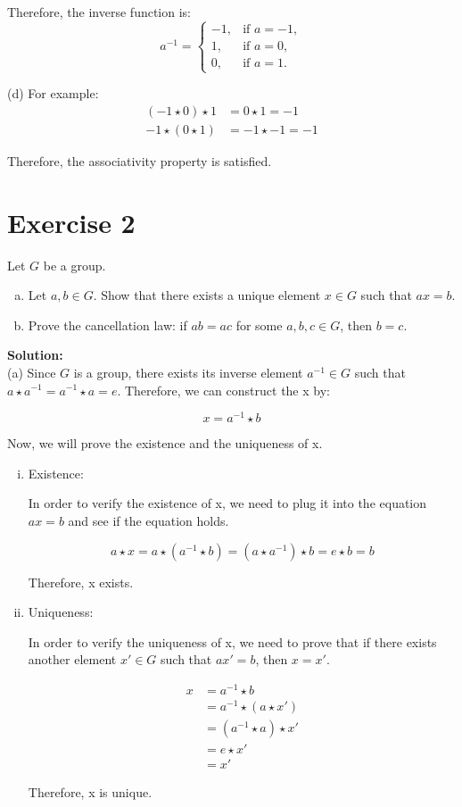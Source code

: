 \documentclass{article}
\begin{document}
Therefore, the inverse function is:
\[
a^{-1} = \begin{cases}
-1, & \text{if } a = -1, \\
1, & \text{if } a = 0, \\
0, & \text{if } a = 1.
\end{cases}
\]

(d) For example:
\begin{align*}
(-1 \star 0) \star 1 &= 0 \star 1 = -1 \\
-1 \star (0 \star 1) &= -1 \star -1 = -1
\end{align*}

Therefore, the associativity property is satisfied.

\newpage

\section*{Exercise 2}

Let $G$ be a group.
\begin{enumerate}[(a)]
\item Let $a,b \in G$. Show that there exists a unique element $x \in G$ such that $ax=b$.
\item Prove the cancellation law: if $ab=ac$ for some $a,b,c \in G$, then $b=c$.
\end{enumerate}

\textbf{Solution:}\\

(a) Since $G$ is a group, there exists its inverse element $a^{-1} \in G$ such that $a \star a^{-1} = a^{-1} \star a = e$. Therefore, we can construct the x by:

$$x = a^{-1} \star b$$

Now, we will prove the existence and the uniqueness of x.

\begin{enumerate}[(i)]
\item Existence:

In order to verify the existence of x, we need to plug it into the equation $ax=b$ and see if the equation holds.

$$a \star x = a \star (a^{-1} \star b) = (a \star a^{-1}) \star b = e \star b = b$$

Therefore, x exists.

\item Uniqueness:

In order to verify the uniqueness of x, we need to prove that if there exists another element $x' \in G$ such that $ax'=b$, then $x=x'$.

\begin{align*}
x & = a^{-1} \star b \\
& = a^{-1} \star (a \star x') \\
& = (a^{-1} \star a) \star x' \\
& = e \star x' \\
& = x'
\end{align*}

Therefore, x is unique.

\end{enumerate}
\end{document}
